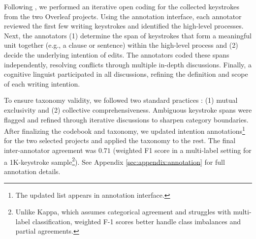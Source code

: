 Following \citet{pustejovsky2017designing}, we performed an iterative open coding for the collected keystrokes from the two Overleaf projects. 
Using the annotation interface, each annotator reviewed the first few writing keystrokes and identified the high-level processes.
Next, the annotators (1) determine the span of keystrokes that form a meaningful unit together (e.g., a clause or sentence) within the high-level process and (2) decide the underlying intention of edits.
The annotators coded these spans independently, resolving conflicts through multiple in-depth discussions. Finally, a cognitive linguist participated in all discussions, refining the definition and scope of each writing intention. 

To ensure taxonomy validity, we followed two standard practices \cite{nickerson2013method, kundisch2021update}: (1) mutual exclusivity and (2) collective comprehensiveness. Ambiguous keystroke spans were flagged and refined through iterative discussions to sharpen category boundaries. After finalizing the codebook and taxonomy, we updated intention annotations\footnote{The updated list appears in annotation interface.} for the two selected projects and applied the taxonomy to the rest. The final inter-annotator agreement was $0.71$ (weighted F1 score in a multi-label setting for a 1K-keystroke sample\footnote{Unlike Kappa, which assumes categorical agreement and struggles with multi-label classification, weighted F-1 scores better handle class imbalances and partial agreements.}). See Appendix \ref{sec:appendix:annotation} for full annotation details.

